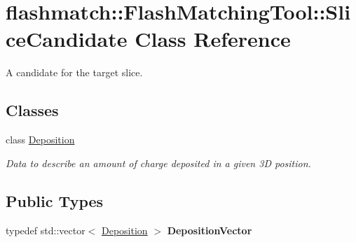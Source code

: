 \hypertarget{classflashmatch_1_1FlashMatchingTool_1_1SliceCandidate}{}\section{flashmatch\+:\+:Flash\+Matching\+Tool\+:\+:Slice\+Candidate Class Reference}
\label{classflashmatch_1_1FlashMatchingTool_1_1SliceCandidate}


A candidate for the target slice.  


\subsection*{Classes}
\begin{DoxyCompactItemize}
\item 
class \hyperlink{classflashmatch_1_1FlashMatchingTool_1_1SliceCandidate_1_1Deposition}{Deposition}
\begin{DoxyCompactList}\small\item\em Data to describe an amount of charge deposited in a given 3D position. \end{DoxyCompactList}\end{DoxyCompactItemize}
\subsection*{Public Types}
\begin{DoxyCompactItemize}
\item 
typedef std\+::vector$<$ \hyperlink{classflashmatch_1_1FlashMatchingTool_1_1SliceCandidate_1_1Deposition}{Deposition} $>$ {\bfseries Deposition\+Vector}\hypertarget{classflashmatch_1_1FlashMatchingTool_1_1SliceCandidate_aa57131c7a2914bae3315c3dae1dc9e9f}{}\label{classflashmatch_1_1FlashMatchingTool_1_1SliceCandidate_aa57131c7a2914bae3315c3dae1dc9e9f}

\end{DoxyCompactItemize}
